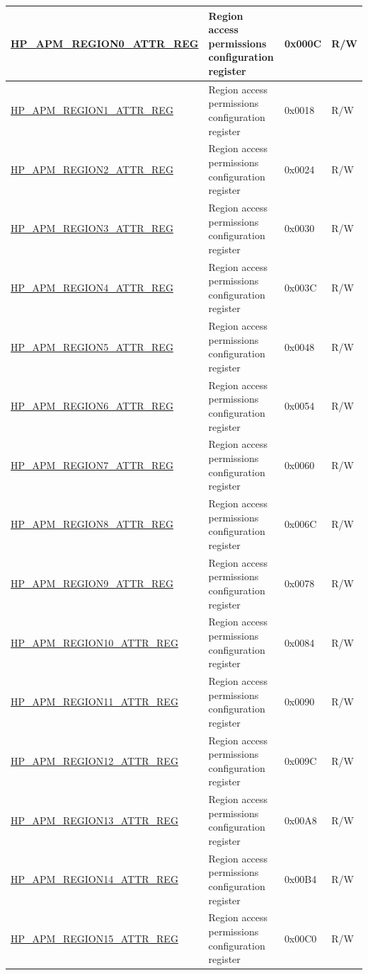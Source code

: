 \begin{longtable}{ | L{6.5cm} | L{6.5cm} | l | l| }
\hyperref[regdesc:HPAPMREGIONNATTRREG]{HP\_APM\_REGION0\_ATTR\_REG} & Region access permissions configuration register & 0x000C & R/W \\ \hline
\hyperref[regdesc:HPAPMREGIONNATTRREG]{HP\_APM\_REGION1\_ATTR\_REG} & Region access permissions configuration register & 0x0018 & R/W \\ \hline
\hyperref[regdesc:HPAPMREGIONNATTRREG]{HP\_APM\_REGION2\_ATTR\_REG} & Region access permissions configuration register & 0x0024 & R/W \\ \hline
\hyperref[regdesc:HPAPMREGIONNATTRREG]{HP\_APM\_REGION3\_ATTR\_REG} & Region access permissions configuration register & 0x0030 & R/W \\ \hline
\hyperref[regdesc:HPAPMREGIONNATTRREG]{HP\_APM\_REGION4\_ATTR\_REG} & Region access permissions configuration register & 0x003C & R/W \\ \hline
\hyperref[regdesc:HPAPMREGIONNATTRREG]{HP\_APM\_REGION5\_ATTR\_REG} & Region access permissions configuration register & 0x0048 & R/W \\ \hline
\hyperref[regdesc:HPAPMREGIONNATTRREG]{HP\_APM\_REGION6\_ATTR\_REG} & Region access permissions configuration register & 0x0054 & R/W \\ \hline
\hyperref[regdesc:HPAPMREGIONNATTRREG]{HP\_APM\_REGION7\_ATTR\_REG} & Region access permissions configuration register & 0x0060 & R/W \\ \hline
\hyperref[regdesc:HPAPMREGIONNATTRREG]{HP\_APM\_REGION8\_ATTR\_REG} & Region access permissions configuration register & 0x006C & R/W \\ \hline
\hyperref[regdesc:HPAPMREGIONNATTRREG]{HP\_APM\_REGION9\_ATTR\_REG} & Region access permissions configuration register & 0x0078 & R/W \\ \hline
\hyperref[regdesc:HPAPMREGIONNATTRREG]{HP\_APM\_REGION10\_ATTR\_REG} & Region access permissions configuration register & 0x0084 & R/W \\ \hline
\hyperref[regdesc:HPAPMREGIONNATTRREG]{HP\_APM\_REGION11\_ATTR\_REG} & Region access permissions configuration register & 0x0090 & R/W \\ \hline
\hyperref[regdesc:HPAPMREGIONNATTRREG]{HP\_APM\_REGION12\_ATTR\_REG} & Region access permissions configuration register & 0x009C & R/W \\ \hline
\hyperref[regdesc:HPAPMREGIONNATTRREG]{HP\_APM\_REGION13\_ATTR\_REG} & Region access permissions configuration register & 0x00A8 & R/W \\ \hline
\hyperref[regdesc:HPAPMREGIONNATTRREG]{HP\_APM\_REGION14\_ATTR\_REG} & Region access permissions configuration register & 0x00B4 & R/W \\ \hline
\hyperref[regdesc:HPAPMREGIONNATTRREG]{HP\_APM\_REGION15\_ATTR\_REG} & Region access permissions configuration register & 0x00C0 & R/W \\ \hline


\end{longtable}
